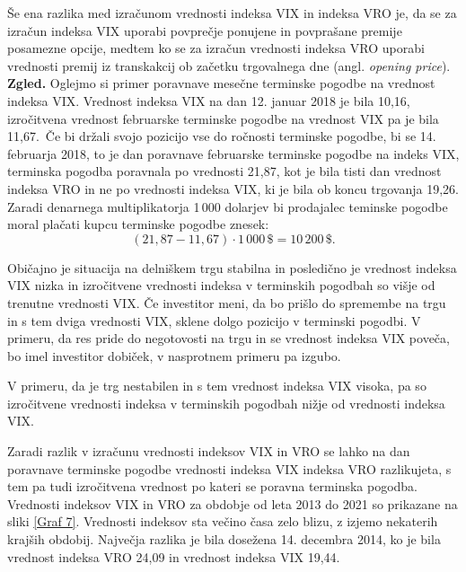\documentclass[12pt,a4paper, reqno]{amsart}
\theoremstyle{definition} %
\theoremstyle{plain} %
\begin{document}
Še ena razlika med izračunom vrednosti indeksa VIX in indeksa VRO je, da se za izračun indeksa VIX uporabi povprečje ponujene in povprašane premije posamezne opcije, medtem ko se za izračun vrednosti indeksa VRO uporabi vrednosti premij iz transkakcij ob začetku trgovalnega dne (angl. \textit{opening price}).\\

\textbf{Zgled.}
Oglejmo si primer poravnave mesečne terminske pogodbe na vrednost indeksa VIX. Vrednost indeksa VIX na dan 12. januar 2018 je bila 10,16, izročitvena vrednost februarske terminske pogodbe na vrednost VIX pa je bila 11,67.\
Če bi držali svojo pozicijo vse do ročnosti terminske pogodbe, bi se 14. februarja 2018, to je dan poravnave februarske terminske pogodbe na indeks VIX, terminska pogodba poravnala po vrednosti 21,87, kot je bila tisti dan vrednost indeksa VRO in ne po vrednosti indeksa VIX, ki je bila ob koncu trgovanja 19,26. Zaradi denarnega multiplikatorja 1\,000 dolarjev bi prodajalec teminske pogodbe moral plačati kupcu terminske pogodbe znesek:
$$
(21,\!87 - 11,\!67) \cdot 1\,000\,\$ = 10\,200\,\$.
$$

Običajno je situacija na delniškem trgu stabilna in posledično je vrednost indeksa VIX nizka in izročitvene vrednosti indeksa v  terminskih pogodbah so višje od trenutne vrednosti VIX. Če investitor meni, da bo prišlo do spremembe na trgu in s tem dviga vrednosti VIX, sklene dolgo pozicijo v terminski pogodbi. V primeru, da res pride do negotovosti na trgu in se vrednost indeksa VIX poveča, bo imel investitor dobiček, v nasprotnem primeru pa izgubo.\

V primeru, da je trg nestabilen in s tem vrednost indeksa VIX visoka, pa so izročitvene vrednosti indeksa v terminskih pogodbah nižje od vrednosti indeksa VIX.\

Zaradi razlik v izračunu vrednosti indeksov VIX in VRO se lahko na dan poravnave terminske pogodbe vrednosti indeksa VIX indeksa VRO razlikujeta, s tem pa tudi  izročitvena vrednost po kateri se poravna terminska pogodba.\\

Vrednosti  indeksov VIX in VRO za obdobje od leta 2013 do 2021 so prikazane na sliki \ref{Graf 7}. Vrednosti indeksov sta večino časa zelo blizu, z izjemo nekaterih krajših obdobij. Največja razlika je bila dosežena 14. decembra 2014, ko je bila vrednost indeksa VRO 24,09 in vrednost indeksa VIX 19,44.
\end{document}
